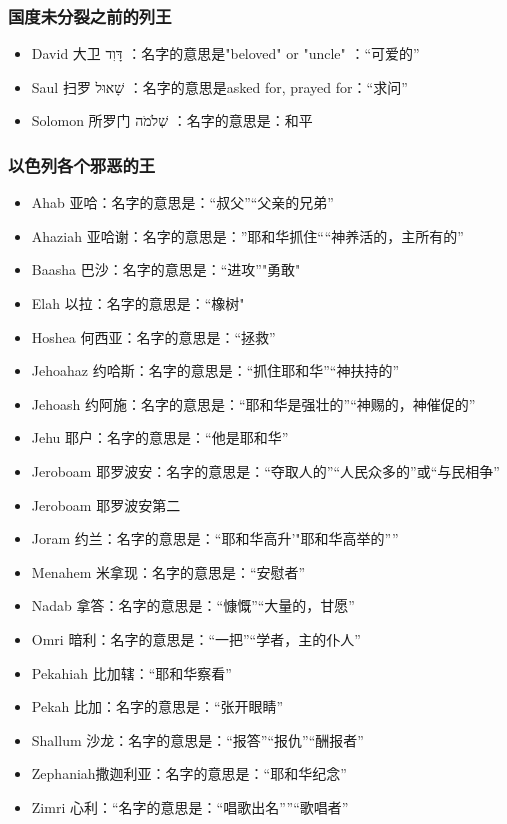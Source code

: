 \subsubsection{国度未分裂之前的列王}
\begin{itemize}
\itemsep-.45em
\item David  大卫 דָּוִד ：名字的意思是"beloved" or "uncle" ：“可爱的”
\item Saul  扫罗 שָׁאוּל ：名字的意思是asked for, prayed for：“求问”
\item Solomon  所罗门 שְׁלֹמֹה ：名字的意思是：和平
\end{itemize}

\subsubsection{以色列各个邪恶的王}
\begin{itemize}
\itemsep-.45em
\item Ahab  亚哈：名字的意思是：“叔父”“父亲的兄弟”
\item Ahaziah  亚哈谢：名字的意思是：”耶和华抓住““神养活的，主所有的”
\item Baasha  巴沙：名字的意思是：“进攻”"勇敢"
\item Elah  以拉：名字的意思是：“橡树"
\item Hoshea  何西亚：名字的意思是：“拯救”
\item Jehoahaz  约哈斯：名字的意思是：“抓住耶和华”“神扶持的”
\item Jehoash  约阿施：名字的意思是：“耶和华是强壮的”“神赐的，神催促的”
\item Jehu  耶户：名字的意思是：“他是耶和华”
\item Jeroboam  耶罗波安：名字的意思是：“夺取人的”“人民众多的”或“与民相争”
\item Jeroboam 耶罗波安第二 
\item Joram  约兰：名字的意思是：“耶和华高升'"耶和华高举的””
\item Menahem  米拿现：名字的意思是：“安慰者”
\item Nadab  拿答：名字的意思是：“慷慨”“大量的，甘愿”
\item Omri  暗利：名字的意思是：“一把”“学者，主的仆人”
\item Pekahiah  比加辖：“耶和华察看”
\item Pekah  比加：名字的意思是：“张开眼睛”
\item Shallum  沙龙：名字的意思是：“报答”“报仇”“酬报者”
\item Zephaniah撒迦利亚：名字的意思是：“耶和华纪念”
\item Zimri  心利：“名字的意思是：“唱歌出名””“歌唱者”
\end{itemize}


